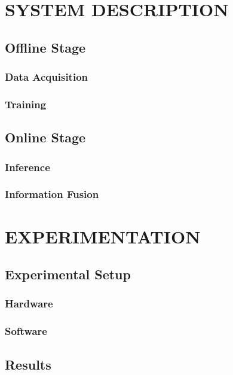 \documentclass[letterpaper, 10 pt, conference]{ieeeconf}  %
\begin{document}
\section{SYSTEM DESCRIPTION}
  \subsection{Offline Stage}

    \subsubsection{Data Acquisition}

    \subsubsection{Training}

  \subsection{Online Stage}

    \subsubsection{Inference}

    \subsubsection{Information Fusion}


\section{EXPERIMENTATION}
  \subsection{Experimental Setup}
    \subsubsection{Hardware}
    \subsubsection{Software}
  \subsection{Results}
\end{document}
